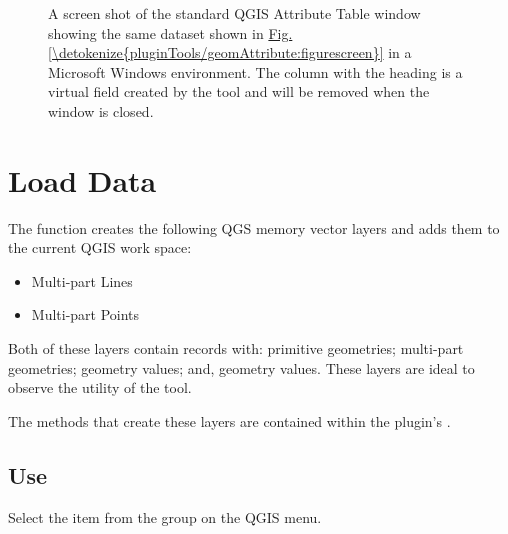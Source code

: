 \documentclass[a4paper,11pt,english]{sphinxmanual}
\begin{document}
\begin{figure}[htbp]
\centering
\capstart

\noindent{}
\caption{A screen shot of the standard QGIS Attribute Table window showing the same dataset shown in \hyperref[\detokenize{pluginTools/geomAttribute:figurescreen}]{Fig.\@ \ref{\detokenize{pluginTools/geomAttribute:figurescreen}}} in a Microsoft Windows environment.  The column with the heading  is a virtual field created by the  tool and will be removed when the  window is closed.}\label{\detokenize{pluginTools/geomAttribute:id3}}\label{\detokenize{pluginTools/geomAttribute:figurescreen2}}\end{figure}


\section{Load Data}
\label{\detokenize{pluginTools/loadData:load-data}}\label{\detokenize{pluginTools/loadData::doc}}
The   function creates the following QGS memory vector layers and adds them to the current QGIS work space:
\begin{itemize}
\item {} 
Multi-part Lines

\item {} 
Multi-part Points

\end{itemize}

Both of these layers contain records with: primitive geometries; multi-part geometries;  geometry values; and,  geometry values.  These layers are ideal to observe the utility of the {\hyperref[\detokenize{pluginTools/geomAttribute:geometryattributetable-page}]{}} tool.

The methods that create these layers are contained within the plugin’s {\hyperref[\detokenize{API:modelvectorlayers-api}]{}}.


\subsection{Use}
\label{\detokenize{pluginTools/loadData:use}}
Select the  item from the  group on the QGIS  menu.
\end{document}

